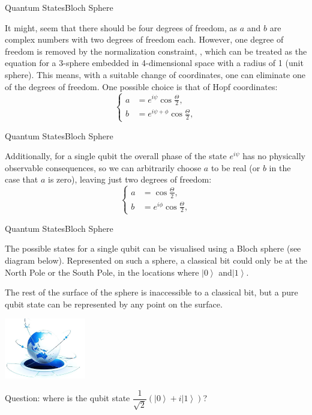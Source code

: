 \documentclass[beamer,serif]{beamer}
\begin{document}
\begin{frame}{Quantum States}{Bloch Sphere}
\par It might, seem that there should be four degrees of freedom, as $a$ and $b$ are complex numbers with two degrees of freedom each. However, one degree of freedom is removed by the normalization constraint, , which can be treated as the equation for a 3-sphere embedded in 4-dimensional space with a radius of 1 (unit sphere). This means, with a suitable change of coordinates, one can eliminate one of the degrees of freedom. One possible choice is that of Hopf coordinates:
\begin{equation}
\left\{
\begin{aligned}
a & = e^{i\psi}\cos\frac{\Theta}{2},	\\
b & = e^{i\psi+\phi}\cos\frac{\Theta}{2},
\end{aligned}
\right.
\end {equation}	
\end{frame}

\begin{frame}{Quantum States}{Bloch Sphere}
	\par Additionally, for a single qubit the overall phase of the state $e^{i\psi}$ has no physically observable consequences, so we can arbitrarily choose $a$ to be real (or $b$ in the case that $a$ is zero), leaving just two degrees of freedom:
	\begin{equation}
		\left\{
		\begin{aligned}
			a & = \cos\frac{\Theta}{2},	\\
			b & = e^{i\phi}\cos\frac{\Theta}{2},
		\end{aligned}
		\right.
	\end {equation}	
\end{frame}

\begin{frame}{Quantum States}{Bloch Sphere}
	\par The possible states for a single qubit can be visualised using a Bloch sphere (see diagram below). Represented on such a sphere, a classical bit could only be at the North Pole or the South Pole, in the locations where $\left| 0 \right\rangle$ and$\left| 1 \right\rangle$.
	\par The rest of the surface of the sphere is inaccessible to a classical bit, but a pure qubit state can be represented by any point on the surface.
	\par \includegraphics[height=100px]{Sphere.png}
	\par Question: where is the qubit state $\dfrac{1}{\sqrt{2}}(\left|0\right\rangle+i\left|1\right\rangle)$?
\end{frame}
\end{document}
